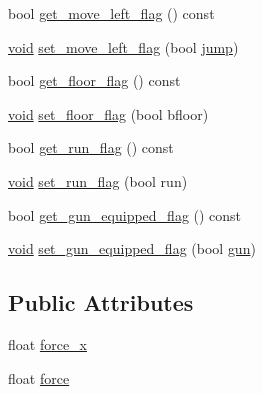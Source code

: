 \begin{DoxyCompactItemize}
\item 
bool \hyperlink{classAnimated__Player__Actor_aad2d5d5761775d725237d742e22ea79a}{get\+\_\+move\+\_\+left\+\_\+flag} () const
\item 
\hyperlink{imgui__impl__opengl3__loader_8h_ac668e7cffd9e2e9cfee428b9b2f34fa7}{void} \hyperlink{classAnimated__Player__Actor_ac09411ed578cb6415b04b3c6f23cf5b5}{set\+\_\+move\+\_\+left\+\_\+flag} (bool \hyperlink{classAnimated__Player__Actor_a05ff973dde6e3409c66b933407748997}{jump})
\item 
bool \hyperlink{classAnimated__Player__Actor_a5b8cbfd84d0663e73d11f92d91349081}{get\+\_\+floor\+\_\+flag} () const
\item 
\hyperlink{imgui__impl__opengl3__loader_8h_ac668e7cffd9e2e9cfee428b9b2f34fa7}{void} \hyperlink{classAnimated__Player__Actor_accd8fe5d483364886bb677faa7ee9a83}{set\+\_\+floor\+\_\+flag} (bool bfloor)
\item 
bool \hyperlink{classAnimated__Player__Actor_ac9440a10f172d940409e0d8abaa1606c}{get\+\_\+run\+\_\+flag} () const
\item 
\hyperlink{imgui__impl__opengl3__loader_8h_ac668e7cffd9e2e9cfee428b9b2f34fa7}{void} \hyperlink{classAnimated__Player__Actor_a3109b8d2f5fcabfde409edfe5d1d93b3}{set\+\_\+run\+\_\+flag} (bool run)
\item 
bool \hyperlink{classAnimated__Player__Actor_a898d6a22c942403470ce35d21eb38ec9}{get\+\_\+gun\+\_\+equipped\+\_\+flag} () const
\item 
\hyperlink{imgui__impl__opengl3__loader_8h_ac668e7cffd9e2e9cfee428b9b2f34fa7}{void} \hyperlink{classAnimated__Player__Actor_a6e291bd8d34967d94386067affd48998}{set\+\_\+gun\+\_\+equipped\+\_\+flag} (bool \hyperlink{game__play__state_8cpp_add80b8ad6081fe06bcfb1956a830b5fd}{gun})
\end{DoxyCompactItemize}
\subsection*{Public Attributes}
\begin{DoxyCompactItemize}
\item 
float \hyperlink{classAnimated__Player__Actor_a0b42068bb0686dd7009c1bea18ad7c1d}{force\+\_\+x}
\item 
float \hyperlink{classAnimated__Player__Actor_ade36a912f45284335623b4caf62a792c}{force}
\end{DoxyCompactItemize}

